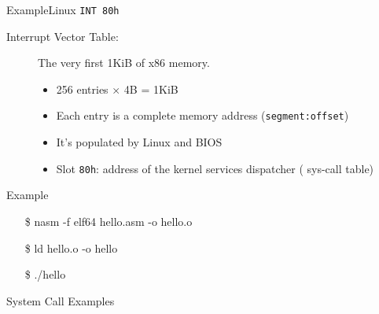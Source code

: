 \begin{frame}{Example}{Linux \texttt{INT 80h}}
  \begin{description}
  \item[Interrupt Vector Table:] The very first 1KiB of x86 memory. 
    \begin{itemize} 
    \item 256 entries $\times$ 4B = 1KiB
    \item Each entry is a complete memory address (\texttt{segment:offset})
    \item It's populated by Linux and BIOS
    \item Slot \texttt{80h}: address of the kernel services dispatcher ({\pright} sys-call table)
    \end{itemize}
  \end{description}
\end{frame}

\begin{frame}{Example}
  \begin{center}
  \end{center}
  \begin{block}{}
    \ttfamily
    \begin{enumerate}
    \item[\$] nasm -f elf64 hello.asm -o hello.o
    \item[\$] ld hello.o -o hello
    \item[\$] ./hello
    \end{enumerate}
  \end{block}
\end{frame}

\begin{frame}%
  \begin{center}
  \end{center}
\end{frame}

\begin{frame}{System Call Examples}
  \begin{block}{}
    \begin{center}
    \end{center}
  \end{block}
  \qquad{}
\end{frame}

